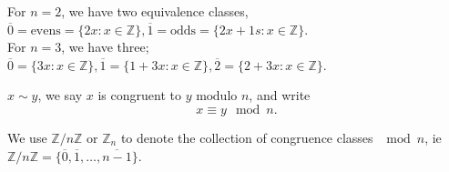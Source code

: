 \documentclass[12pt,oneside]{article}
\begin{document}
\begin{example}
  For $n = 2$, we have two equivalence classes, $\overline{0} =\text{evens} = \{2x : x \in \mathbb{Z}\}, \overline{1} = \text{odds} = \{2x + 1s: x \in \mathbb{Z}\}$.\\
  For $n = 3$, we have three; $\overline{0} = \{3x : x \in \mathbb{Z}\}, \overline{1} = \{1 + 3x : x \in \mathbb{Z}\}, \overline{2} = \{2 + 3x : x \in \mathbb{Z}\}$.
\end{example}


\begin{definition}
  $x \sim y$, we say $x$ is congruent to $y \text{ modulo } n$, and write \[x \equiv y \mod n.\]
\end{definition}

\begin{definition}
  We use $\mathbb{Z}/ n \mathbb{Z}$ or $\mathbb{Z}_n$ to denote the collection of congruence classes $\mod n$, ie $\mathbb{Z}/ n \mathbb{Z} = \{\overline{0}, \overline{1}, \dots, \overline{n-1}\}$.
\end{definition}
\end{document}
